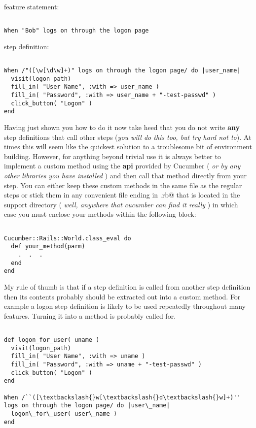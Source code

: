 \documentclass[10pt]{book}
\begin{document}
feature statement:
\begin{verbatim}

When "Bob" logs on through the logon page

\end{verbatim}

step definition:
\begin{verbatim}

When /"([\w[\d\w]+)" logs on through the logon page/ do |user_name|
  visit(logon_path)
  fill_in( "User Name", :with => user_name )
  fill_in( "Password", :with => user_name + "-test-passwd" )
  click_button( "Logon" )
end

\end{verbatim}

Having just shown you how to do it now take heed that you do not write \textbf{any} step definitions that call other steps (\emph{you will do this too, but try hard not to}).  At times this will seem like the quickest solution to a troublesome bit of environment building.  However, for anything beyond trivial use it is always better to implement a custom method using the \textbf{api} provided by Cucumber ( \emph{or by any other libraries you have installed} ) and then call that method directly from your step.  You can either keep these custom methods in the same file as the regular steps or stick them in any convenient file ending in \verb@.rb@ that is located in the support directory ( \emph{well, anywhere that cucumber can find it really} ) in which case you must enclose your methods within the following block:
\begin{verbatim}

Cucumber::Rails::World.class_eval do
  def your_method(parm)
    .  .  .
  end
end

\end{verbatim}

My rule of thumb is that if a step definition is called from another step definition then its contents probably should be extracted out into a custom method.  For example a logon step definition is likely to be used repeatedly throughout many features.  Turning it into a method is probably called for.
\begin{verbatim}

def logon_for_user( uname )
  visit(logon_path)
  fill_in( "User Name", :with => uname )
  fill_in( "Password", :with => uname + "-test-passwd" )
  click_button( "Logon" )
end

When /``([\textbackslash{}w[\textbackslash{}d\textbackslash{}w]+)'' logs on through the logon page/ do |user\_name|
  logon\_for\_user( user\_name )
end

\end{verbatim}
\end{document}
